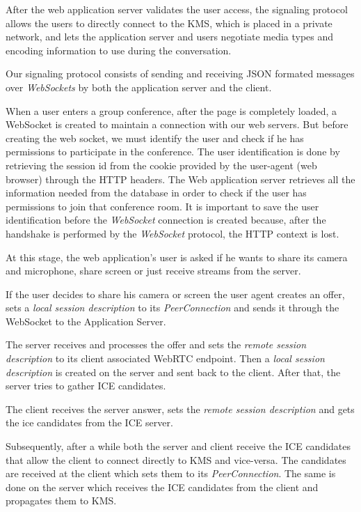 \documentclass[10pt,conference]{IEEEtran}
\begin{document}
After the web application server validates the user access, the signaling protocol allows the users to directly connect to the \gls{KMS}, which is placed in a private network, and lets the application server and users negotiate media types and encoding information to use during the conversation.

Our signaling protocol consists of sending and receiving \gls{JSON} formated messages over \emph{WebSockets} by both the application server and the client. 


When a user enters a group conference, after the page is completely loaded, a WebSocket is created to maintain a connection with our web servers. 
But before creating the web socket, we must identify the user and check if he has permissions to participate in the conference. The user identification is done by retrieving the session id from the cookie provided by the user-agent (web browser) through the \gls{HTTP} headers.
The Web application server retrieves all the information needed from the database in order to check if the user has permissions to join that conference room. It is important to save the user identification before the \emph{WebSocket} connection is created because, after the handshake is performed by the \emph{WebSocket} protocol\cite{rfc6455}, the \gls{HTTP} context is lost.

At this stage, the web application's user is asked if he wants to share its camera and microphone, share screen or just receive streams from the server. 

If the user decides to share his camera or screen the user agent creates an offer, sets a \emph{local session description} to its \emph{PeerConnection} and sends it through the WebSocket to the Application Server.

The server receives and processes the offer and sets the \emph{remote session description} to its client associated \gls{WebRTC} endpoint. Then a \emph{local session description} is created on the server and sent back to the client. After that, the server tries to gather \gls{ICE} candidates.

The client receives the server answer, sets the \emph{remote session description} and gets the ice candidates from the \gls{ICE} server.

Subsequently, after a while both the server and client receive the \gls{ICE} candidates that allow the client to connect directly to \gls{KMS} and vice-versa. The candidates are received at the client which sets them to its \emph{PeerConnection}. The same is done on the server which receives the \gls{ICE} candidates from the client and propagates them to \gls{KMS}.
\end{document}
